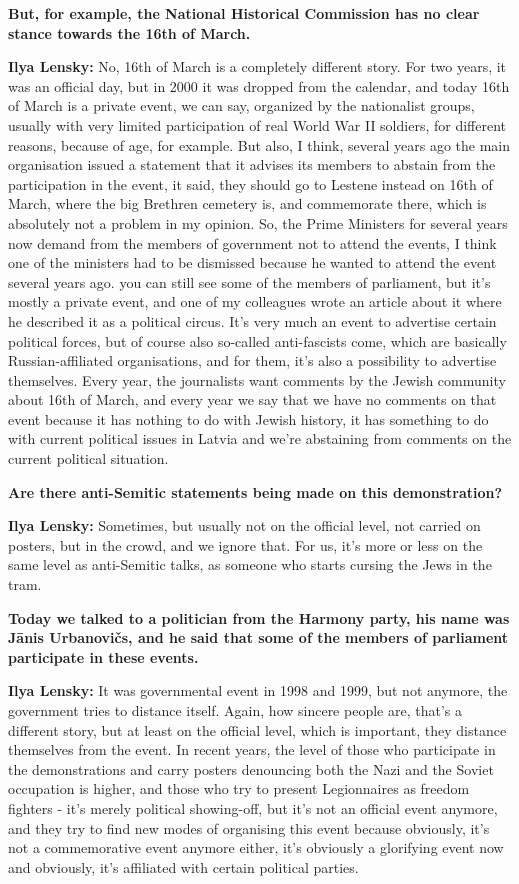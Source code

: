 \textbf{But, for example, the National Historical Commission has no clear stance towards the 16th of March.}

\textbf{Ilya Lensky:} No, 16th of March is a completely different story. For two years, it was an official day, but in 2000 it was dropped from the calendar, and today 16th of March is a private event, we can say, organized by the nationalist groups, usually with very limited participation of real World War II soldiers, for different reasons, because of age, for example. But also, I think, several years ago the main organisation issued a statement that it advises its members to abstain from the participation in the event, it said, they should go to Lestene instead  on 16th of March, where the big Brethren cemetery is, and commemorate there, which is absolutely not a problem in my opinion. So, the Prime Ministers for several years now demand from the members of government not to attend the events, I think one of the ministers had to be dismissed because he wanted to attend the event several years ago. you can still see some of the members of parliament, but it’s mostly a private event, and one of my colleagues wrote an article about it where he described it as a political circus. It’s very much an event to advertise certain political forces, but of course also so-called anti-fascists come, which are basically Russian-affiliated organisations, and for them, it’s also a possibility to advertise themselves. Every year, the journalists want comments by the Jewish community about 16th of March, and every year we say that we have no comments on that event because it has nothing to do with Jewish history, it has something to do with current political issues in Latvia and we’re abstaining from comments on the current political situation. 

\textbf{Are there anti-Semitic statements being made on this demonstration?} 

\textbf{Ilya Lensky:} Sometimes, but usually not on the official level, not carried on posters, but in the crowd, and we ignore that. 
For us, it’s more or less on the same level as anti-Semitic talks, as someone who starts cursing the Jews in the tram. 

\textbf{Today we talked to a politician from the Harmony party, his name was Jānis Urbanovičs, and he said that some of the members of parliament participate in these events.} 

\textbf{Ilya Lensky:} It was governmental event in 1998 and 1999, but not anymore, the government tries to distance itself. Again, how sincere people are, that’s a different story, but at least on the official level, which is important, they distance themselves from the event. In recent years, the level of those who participate in the demonstrations and carry posters denouncing both the Nazi and the Soviet occupation  is higher, and those who try to present Legionnaires as freedom fighters - it’s merely political showing-off, but it’s not an official event anymore, and they try to find new modes of organising this event because obviously, it’s not a commemorative event anymore either, it’s obviously a glorifying event now and obviously, it’s affiliated with certain political parties. 

